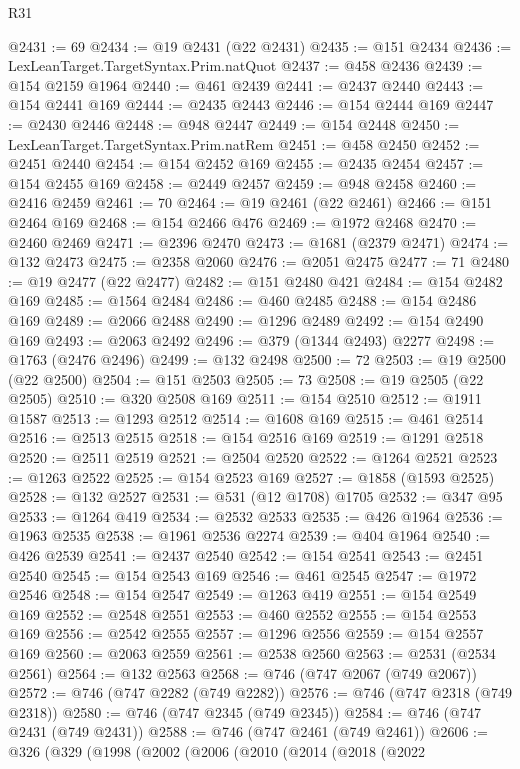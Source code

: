 \begin{lexlean}{R31}
\begin{coremodule}
@2431 := 69
@2434 := @19 @2431 (@22 @2431)
@2435 := @151 @2434
@2436 := LexLeanTarget.TargetSyntax.Prim.natQuot
@2437 := @458 @2436
@2439 := @154 @2159 @1964
@2440 := @461 @2439
@2441 := @2437 @2440
@2443 := @154 @2441 @169
@2444 := @2435 @2443
@2446 := @154 @2444 @169
@2447 := @2430 @2446
@2448 := @948 @2447
@2449 := @154 @2448
@2450 := LexLeanTarget.TargetSyntax.Prim.natRem
@2451 := @458 @2450
@2452 := @2451 @2440
@2454 := @154 @2452 @169
@2455 := @2435 @2454
@2457 := @154 @2455 @169
@2458 := @2449 @2457
@2459 := @948 @2458
@2460 := @2416 @2459
@2461 := 70
@2464 := @19 @2461 (@22 @2461)
@2466 := @151 @2464 @169
@2468 := @154 @2466 @476
@2469 := @1972 @2468
@2470 := @2460 @2469
@2471 := @2396 @2470
@2473 := @1681 (@2379 @2471)
@2474 := @132 @2473
@2475 := @2358 @2060
@2476 := @2051 @2475
@2477 := 71
@2480 := @19 @2477 (@22 @2477)
@2482 := @151 @2480 @421
@2484 := @154 @2482 @169
@2485 := @1564 @2484
@2486 := @460 @2485
@2488 := @154 @2486 @169
@2489 := @2066 @2488
@2490 := @1296 @2489
@2492 := @154 @2490 @169
@2493 := @2063 @2492
@2496 := @379 (@1344 @2493) @2277
@2498 := @1763 (@2476 @2496)
@2499 := @132 @2498
@2500 := 72
@2503 := @19 @2500 (@22 @2500)
@2504 := @151 @2503
@2505 := 73
@2508 := @19 @2505 (@22 @2505)
@2510 := @320 @2508 @169
@2511 := @154 @2510
@2512 := @1911 @1587
@2513 := @1293 @2512
@2514 := @1608 @169
@2515 := @461 @2514
@2516 := @2513 @2515
@2518 := @154 @2516 @169
@2519 := @1291 @2518
@2520 := @2511 @2519
@2521 := @2504 @2520
@2522 := @1264 @2521
@2523 := @1263 @2522
@2525 := @154 @2523 @169
@2527 := @1858 (@1593 @2525)
@2528 := @132 @2527
@2531 := @531 (@12 @1708) @1705
@2532 := @347 @95
@2533 := @1264 @419
@2534 := @2532 @2533
@2535 := @426 @1964
@2536 := @1963 @2535
@2538 := @1961 @2536 @2274
@2539 := @404 @1964
@2540 := @426 @2539
@2541 := @2437 @2540
@2542 := @154 @2541
@2543 := @2451 @2540
@2545 := @154 @2543 @169
@2546 := @461 @2545
@2547 := @1972 @2546
@2548 := @154 @2547
@2549 := @1263 @419
@2551 := @154 @2549 @169
@2552 := @2548 @2551
@2553 := @460 @2552
@2555 := @154 @2553 @169
@2556 := @2542 @2555
@2557 := @1296 @2556
@2559 := @154 @2557 @169
@2560 := @2063 @2559
@2561 := @2538 @2560
@2563 := @2531 (@2534 @2561)
@2564 := @132 @2563
@2568 := @746 (@747 @2067 (@749 @2067))
@2572 := @746 (@747 @2282 (@749 @2282))
@2576 := @746 (@747 @2318 (@749 @2318))
@2580 := @746 (@747 @2345 (@749 @2345))
@2584 := @746 (@747 @2431 (@749 @2431))
@2588 := @746 (@747 @2461 (@749 @2461))
@2606 := @326
    (@329
      (@1998
        (@2002
          (@2006
            (@2010
              (@2014
                (@2018
                  (@2022

\end{coremodule}
\end{lexlean}
